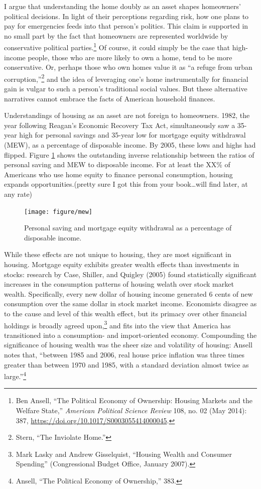 \documentclass[12pt,oneside]{psthesis}
\begin{document}
I argue that understanding the home doubly as an asset shapes homeowners' political decisions.
In light of their perceptions regarding risk, how one plans to pay for emergencies feeds into that person's politics.
This claim is supported in no small part by the fact that homeowners are represented worldwide by conservative political parties.\footnote{Ben Ansell, ``The Political Economy of Ownership: Housing Markets and the Welfare State,'' \emph{American Political Science Review} 108, no. 02 (May 2014): 387, \url{https://doi.org/10.1017/S0003055414000045}.}
Of course, it could simply be the case that high-income people, those who are more likely to own a home, tend to be more conservative.
Or, perhaps those who own homes value it as ``a refuge from urban corruption,''\footnote{Stern, ``The Inviolate Home.''} and the idea of leveraging one's home instrumentally for financial gain is vulgar to such a person's traditional social values.
But these alternative narratives cannot embrace the facts of American household finances.

Understandings of housing as an asset are not foreign to homeowners.
1982, the year following Reagan's Economic Recovery Tax Act, simultaneously saw a 35-year high for personal savings and 35-year low for mortgage equity withdrawal (MEW), as a percentage of disposable income.
By 2005, these lows and highs had flipped.
Figure \ref{fig:mew} shows the outstanding inverse relationship between the ratios of personal saving and MEW to disposable income.
For at least the XX\% of Americans who use home equity to finance personal consumption, housing expands opportunities.(pretty sure I got this from your book\ldots will find later, at any rate)
\begin{figure}

{\centering \texttt{[image: figure/mew]} 

}

\caption{Personal saving and mortgage equity withdrawal as a percentage of disposable income.}\label{fig:mew}
\end{figure}
While these effects are not unique to housing, they are most significant in housing.
Mortgage equity exhibits greater wealth effects than investments in stocks: research by Case, Shiller, and Quigley (2005) found statistically significant increases in the consumption patterns of housing welath over stock market wealth.
Specifically, every new dollar of housing income generated 6 cents of new consumption over the same dollar in stock market income.
Economists disagree as to the cause and level of this wealth effect, but its primacy over other financial holdings is broadly agreed upon,\footnote{Mark Lasky and Andrew Gisselquist, ``Housing Wealth and Consumer Spending'' (Congressional Budget Office, January 2007).} and fits into the view that America has transitioned into a consumption- and import-oriented economy.
Compounding the significance of housing wealth was the sheer size and volatility of housing: Ansell notes that, ``between 1985 and 2006, real house price inflation was three times greater than between 1970 and 1985, with a standard deviation almost twice as large.''\footnote{Ansell, ``The Political Economy of Ownership,'' 383.}
\end{document}
